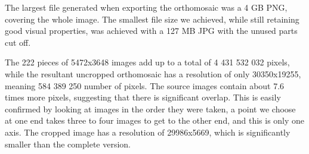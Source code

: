\documentclass[../Head/Main.tex]{subfiles}
\begin{document}
The largest file generated when exporting the orthomosaic was a 4 GB PNG, covering the whole image. 
The smallest file size we achieved, while still retaining good visual properties, was achieved with a 127 MB JPG with the unused parts cut off.

The 222 pieces of 5472x3648 images add up to a total of 4 431 532 032 pixels, while the resultant uncropped orthomosaic has a resolution of only 30350x19255, meaning 584 389 250 number of pixels.
The source images contain about 7.6 times more pixels, suggesting that there is significant overlap.
This is easily confirmed by looking at images in the order they were taken, a point we choose at one end takes three to four images to get to the other end, and this is only one axis.
The cropped image has a resolution of 29986x5669, which is significantly smaller than the complete version.
\end{document}
